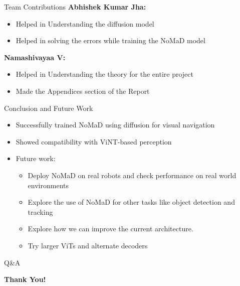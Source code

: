 \documentclass{beamer}
\begin{document}
\begin{frame}{Team Contributions}
    \textbf{Abhishek Kumar Jha:} \\
    \begin{itemize}
        \item Helped in Understanding the diffusion model
        \item Helped in solving the errors while training the NoMaD model
    \end{itemize}
    \textbf{Namashivayaa V:} \\
    \begin{itemize}
        \item Helped in Understanding the theory for the entire project
        \item Made the Appendices section of the Report
    \end{itemize}
\end{frame}

\begin{frame}{Conclusion and Future Work}
\begin{itemize}
    \item Successfully trained NoMaD using diffusion for visual navigation
    \item Showed compatibility with ViNT-based perception
    \item Future work:
    \begin{itemize}
        \item Deploy NoMaD on real robots and check performance on real world environments
        \item Explore the use of NoMaD for other tasks like object detection and tracking
        \item Explore how we can improve the current architecture.
        \item Try larger ViTs and alternate decoders
    \end{itemize}
\end{itemize}
\end{frame}

\begin{frame}{Q\&A}
    \begin{center}
        \Huge{\textbf{Thank You!}}\\
    \end{center}
\end{frame}
\end{document}
